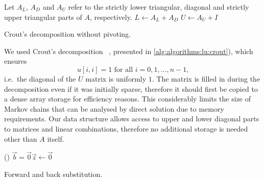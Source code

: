 \begin{algorithm}
  Let $A_L$, $A_D$ and $A_U$ refer to the strictly lower triangular,
  diagonal and strictly upper triangular parts of $A$, respectively.\;
  $L \gets A_L + A_D$\;
  $U \gets A_U + I$\;
  \;
  \caption{Crout's  decomposition without pivoting.}
  \label{alg:algorithms:lu:crout}
\end{algorithm}

We used Crout's  decomposition%
~\citep[Section~2.3.1]{press2007numerical}, presented in
\vref{alg:algorithms:lu:crout}), which ensures
\begin{equation}
  u[i, i] = 1 \text{ for all $i = 0, 1, \ldots, n - 1$,}
\end{equation}
i.e.~the diagonal of the $U$ matrix is uniformly $1$. The matrix is
filled in during the decomposition even if it was initially sparse,
therefore it should first be copied to a dense array storage for
efficiency reasons. This considerably limits the size of Markov chains that
can be analysed by direct solution due to memory requirements. Our
data structure allows access to upper and lower diagonal parts to
matrices and linear combinations, therefore no additional storage is
needed other than $A$ itself.

\begin{algorithm}
  \;
  \lIf()
  {$\vec{b} = \vec{0}$}{$\vec{z} \gets \vec{0}$}
   
  \;
  \caption{Forward and back substitution.}
  \label{alg:algorithms:lu:substitution}
\end{algorithm}

